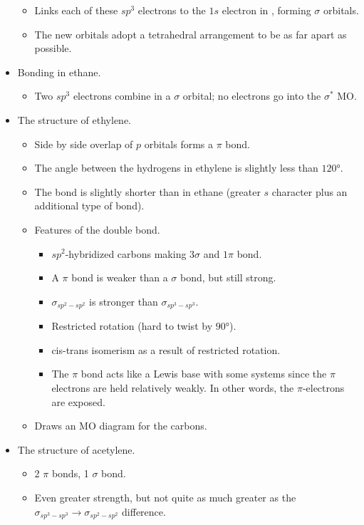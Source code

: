 \documentclass[../notes.tex]{subfiles}
\begin{document}
\begin{itemize}
\begin{itemize}
        \item Links each of these $sp^3$ electrons to the $1s$ electron in , forming $\sigma$ orbitals.
        \item The new orbitals adopt a tetrahedral arrangement to be as far apart as possible.
    \end{itemize}
    \item Bonding in ethane.
    \begin{itemize}
        \item Two $sp^3$ electrons combine in a $\sigma$ orbital; no electrons go into the $\sigma^*$ MO.
    \end{itemize}
    \item The structure of ethylene.
    \begin{itemize}
        \item Side by side overlap of $p$ orbitals forms a $\pi$ bond.
        \item The angle between the hydrogens in ethylene is slightly less than $\ang{120}$.
        \item The bond is slightly shorter than in ethane (greater $s$ character plus an additional type of bond).
        \item Features of the  double bond.
        \begin{itemize}
            \item $sp^2$-hybridized carbons making $3\sigma$ and $1\pi$ bond.
            \item A $\pi$ bond is weaker than a $\sigma$ bond, but still strong.
            \item $\sigma_{sp^2-sp^2}$ is stronger than $\sigma_{sp^3-sp^3}$.
            \item Restricted rotation (hard to twist  by $\ang{90}$).
            \item cis-trans isomerism as a result of restricted rotation.
            \item The $\pi$ bond acts like a Lewis base with some systems since the $\pi$ electrons are held relatively weakly. In other words, the $\pi$-electrons are exposed.
        \end{itemize}
        \item Draws an MO diagram for the carbons.
    \end{itemize}
    \item The structure of acetylene.
    \begin{itemize}
        \item 2 $\pi$ bonds, 1 $\sigma$ bond.
        \item Even greater strength, but not quite as much greater as the $\sigma_{sp^3-sp^3}\to\sigma_{sp^2-sp^2}$ difference.
    \end{itemize}
\end{itemize}
\end{document}
